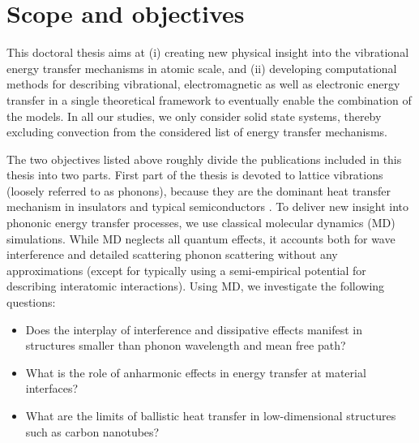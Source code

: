 \section{Scope and objectives}

This doctoral thesis aims at (i) creating new physical insight into the vibrational energy transfer mechanisms in atomic scale, and (ii) developing computational methods for describing vibrational, electromagnetic as well as electronic energy transfer in a single theoretical framework to eventually enable the combination of the models. In all our studies, we only consider solid state systems, thereby excluding convection from the considered list of energy transfer mechanisms. %

The two objectives listed above roughly divide the publications included in this thesis into two parts. First part of the thesis is devoted to lattice vibrations (loosely referred to as phonons), because they are the dominant heat transfer mechanism in insulators and typical semiconductors \cite{chen}. To deliver new insight into phononic energy transfer processes, we use classical molecular dynamics (MD) simulations. While MD neglects all quantum effects, it accounts both for wave interference and detailed scattering phonon scattering without any approximations (except for typically using a semi-empirical potential for describing interatomic interactions). Using MD, we investigate the following questions:
\begin{itemize}
 \item Does the interplay of interference and dissipative effects manifest in structures smaller than phonon wavelength and mean free path?
 \item What is the role of anharmonic effects in energy transfer at material interfaces?
 \item What are the limits of ballistic heat transfer in low-dimensional structures such as carbon nanotubes?
\end{itemize}


